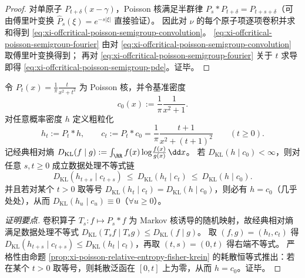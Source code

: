 \begin{proof}
对单原子 \(P_{t+\delta}(x-\gamma)\)，Poisson 核满足半群律 \(P_s*P_{t+\delta}=P_{t+s+\delta}\)（可由傅里叶变换 \(\widehat P_s(\xi)=e^{-s|\xi|}\) 直接验证）。
因此对 \(\nu\) 的每个原子项逐项卷积并求和得到 \eqref{eq:xi-offcritical-poisson-semigroup-convolution}。
\eqref{eq:xi-offcritical-poisson-semigroup-fourier} 由对 \eqref{eq:xi-offcritical-poisson-semigroup-convolution} 取傅里叶变换得到；
再对 \eqref{eq:xi-offcritical-poisson-semigroup-fourier} 关于 \(t\) 求导即得 \eqref{eq:xi-offcritical-poisson-semigroup-pde}。证毕。
\end{proof}

\begin{proposition}\label{prop:xi-poisson-relative-entropy-contraction}
令 \(P_t(x)=\frac{1}{\pi}\frac{t}{x^2+t^2}\) 为 Poisson 核，并令基准密度
\[
c_0(x):=\frac{1}{\pi}\frac{1}{x^2+1}.
\]
对任意概率密度 \(h\) 定义粗粒化
\[
h_t:=P_t*h,\qquad c_t:=P_t*c_0=\frac{1}{\pi}\frac{t+1}{x^2+(t+1)^2}\qquad(t\ge 0).
\]
记经典相对熵
\(
D_{\mathrm{KL}}(f\mid g):=\int_{\RR} f(x)\log\!\frac{f(x)}{g(x)}\,\dd x
\)。
若 \(D_{\mathrm{KL}}(h\mid c_0)<\infty\)，则对任意 \(s,t\ge 0\) 成立数据处理不等式链
\begin{equation}\label{eq:xi-poisson-kl-monotone}
\boxed{\;
D_{\mathrm{KL}}(h_{t+s}\mid c_{t+s})\ \le\ D_{\mathrm{KL}}(h_t\mid c_t)\ \le\ D_{\mathrm{KL}}(h\mid c_0).\;}
\end{equation}
并且若对某个 \(t>0\) 取等号 \(D_{\mathrm{KL}}(h_t\mid c_t)=D_{\mathrm{KL}}(h\mid c_0)\)，则必有 \(h=c_0\)（几乎处处），从而 \(D_{\mathrm{KL}}(h_u\mid c_u)\equiv 0\)（\(\forall u\ge 0\)）。
\end{proposition}

\begin{proof}[证明要点]
卷积算子 \(T_s:f\mapsto P_s*f\) 为 Markov 核诱导的随机映射，故经典相对熵满足数据处理不等式
\(
D_{\mathrm{KL}}(T_s f\mid T_s g)\le D_{\mathrm{KL}}(f\mid g)
\)。
取 \((f,g)=(h_t,c_t)\) 得
\(
D_{\mathrm{KL}}(h_{t+s}\mid c_{t+s})\le D_{\mathrm{KL}}(h_t\mid c_t)
\)，再取 \((t,s)=(0,t)\) 得右端不等式。
严格性由命题 \ref{prop:xi-poisson-relative-entropy-fisher-krein} 的耗散恒等式推出：若在某个 \(t>0\) 取等号，则耗散泛函在 \([0,t]\) 上为零，从而 \(h=c_0\)。证毕。
\end{proof}


